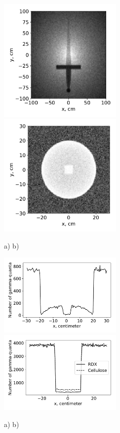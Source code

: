 \documentclass[a4paper]{panl}
\begin{document}
\begin{figure}[t]
    \begin{center}
        \includegraphics[width=60mm]{figures/Sword.pdf} 
        \includegraphics[width=60mm]{figures/UranCube1.pdf}  
        \vspace{-3mm}
        \caption{a) b)}
    \end{center}
    \vspace{-5mm}
\end{figure}

\begin{figure}[t]
    \begin{center}
        \includegraphics[width=60mm]{figures/UranCube2.pdf} 
        \includegraphics[width=60mm]{figures/Hex.pdf}  
        \vspace{-3mm}
        \caption{a) b)}
    \end{center}
    \vspace{-5mm}
\end{figure}
\end{document}

